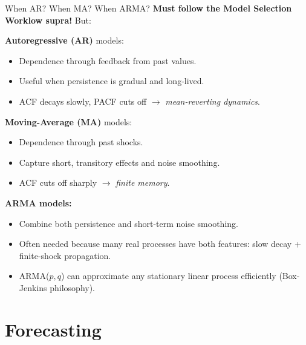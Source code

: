\documentclass{beamer}
\begin{document}
\begin{frame}{When AR? When MA? When ARMA?}
\small
\textbf{Must follow the Model Selection Worklow supra!} But:


\textbf{Autoregressive (AR)} models:
\begin{itemize}
  \item Dependence through feedback from past values.
  \item Useful when persistence is gradual and long-lived.
  \item ACF decays slowly, PACF cuts off $\rightarrow$ \emph{mean-reverting dynamics}.
\end{itemize}

\textbf{Moving-Average (MA)} models:
\begin{itemize}
  \item Dependence through past shocks.
  \item Capture short, transitory effects and noise smoothing.
  \item ACF cuts off sharply $\rightarrow$ \emph{finite memory}.
\end{itemize}

\textbf{ARMA models:}
\begin{itemize}
  \item Combine both persistence and short-term noise smoothing.
  \item Often needed because many real processes have both features:
        slow decay + finite-shock propagation.
  \item ARMA($p,q$) can approximate any stationary linear process efficiently
        (Box-Jenkins philosophy).
\end{itemize}
\end{frame}


\section{Forecasting}
\end{document}
